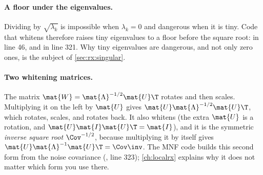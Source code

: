 \paragraph{A floor under the eigenvalues.} Dividing by $\sqrt{\lambda_k}$ is impossible when
$\lambda_k = 0$ and dangerous when it is tiny. Code that whitens therefore raises tiny eigenvalues
to a floor before the square root:  in
 line 46, and
 in 
line 321. Why tiny eigenvalues are dangerous, and not only zero ones, is the subject of
\cref{sec:rx:singular}.

\paragraph{Two whitening matrices.} The matrix $\mat{W} = \mat{\Lambda}^{-1/2}\mat{U}\T$ rotates
and then scales. Multiplying it on the left by $\mat{U}$ gives
$\mat{U}\mat{\Lambda}^{-1/2}\mat{U}\T$, which rotates, scales, and rotates back. It also whitens
(the extra $\mat{U}$ is a rotation, and $\mat{U}\mat{I}\mat{U}\T = \mat{I}$), and it is the
symmetric \emph{inverse square root} $\Cov^{-1/2}$, because multiplying it by itself gives
$\mat{U}\mat{\Lambda}^{-1}\mat{U}\T = \Cov\inv$. The MNF code builds this second form from the
noise covariance (, line 323); \cref{ch:localrx} explains why it does not matter which form you
use there.

